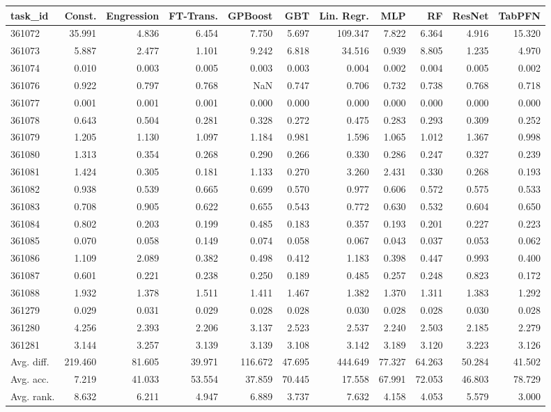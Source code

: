 \begin{tabular}{lrrrrrrrrrr}
\toprule
task\_id & Const. & Engression & FT-Trans. & GPBoost & GBT & Lin. Regr. & MLP & RF & ResNet & TabPFN \\
\midrule
361072 & 35.991 & 4.836 & 6.454 & 7.750 & 5.697 & 109.347 & 7.822 & 6.364 & 4.916 & 15.320 \\
361073 & 5.887 & 2.477 & 1.101 & 9.242 & 6.818 & 34.516 & 0.939 & 8.805 & 1.235 & 4.970 \\
361074 & 0.010 & 0.003 & 0.005 & 0.003 & 0.003 & 0.004 & 0.002 & 0.004 & 0.005 & 0.002 \\
361076 & 0.922 & 0.797 & 0.768 & NaN & 0.747 & 0.706 & 0.732 & 0.738 & 0.768 & 0.718 \\
361077 & 0.001 & 0.001 & 0.001 & 0.000 & 0.000 & 0.000 & 0.000 & 0.000 & 0.000 & 0.000 \\
361078 & 0.643 & 0.504 & 0.281 & 0.328 & 0.272 & 0.475 & 0.283 & 0.293 & 0.309 & 0.252 \\
361079 & 1.205 & 1.130 & 1.097 & 1.184 & 0.981 & 1.596 & 1.065 & 1.012 & 1.367 & 0.998 \\
361080 & 1.313 & 0.354 & 0.268 & 0.290 & 0.266 & 0.330 & 0.286 & 0.247 & 0.327 & 0.239 \\
361081 & 1.424 & 0.305 & 0.181 & 1.133 & 0.270 & 3.260 & 2.431 & 0.330 & 0.268 & 0.193 \\
361082 & 0.938 & 0.539 & 0.665 & 0.699 & 0.570 & 0.977 & 0.606 & 0.572 & 0.575 & 0.533 \\
361083 & 0.708 & 0.905 & 0.622 & 0.655 & 0.543 & 0.772 & 0.630 & 0.532 & 0.604 & 0.650 \\
361084 & 0.802 & 0.203 & 0.199 & 0.485 & 0.183 & 0.357 & 0.193 & 0.201 & 0.227 & 0.223 \\
361085 & 0.070 & 0.058 & 0.149 & 0.074 & 0.058 & 0.067 & 0.043 & 0.037 & 0.053 & 0.062 \\
361086 & 1.109 & 2.089 & 0.382 & 0.498 & 0.412 & 1.183 & 0.398 & 0.447 & 0.993 & 0.400 \\
361087 & 0.601 & 0.221 & 0.238 & 0.250 & 0.189 & 0.485 & 0.257 & 0.248 & 0.823 & 0.172 \\
361088 & 1.932 & 1.378 & 1.511 & 1.411 & 1.467 & 1.382 & 1.370 & 1.311 & 1.383 & 1.292 \\
361279 & 0.029 & 0.031 & 0.029 & 0.028 & 0.028 & 0.030 & 0.028 & 0.028 & 0.030 & 0.028 \\
361280 & 4.256 & 2.393 & 2.206 & 3.137 & 2.523 & 2.537 & 2.240 & 2.503 & 2.185 & 2.279 \\
361281 & 3.144 & 3.257 & 3.139 & 3.139 & 3.108 & 3.142 & 3.189 & 3.120 & 3.223 & 3.126 \\
Avg. diff. & 219.460 & 81.605 & 39.971 & 116.672 & 47.695 & 444.649 & 77.327 & 64.263 & 50.284 & 41.502 \\
Avg. acc. & 7.219 & 41.033 & 53.554 & 37.859 & 70.445 & 17.558 & 67.991 & 72.053 & 46.803 & 78.729 \\
Avg. rank. & 8.632 & 6.211 & 4.947 & 6.889 & 3.737 & 7.632 & 4.158 & 4.053 & 5.579 & 3.000 \\
\bottomrule
\end{tabular}
